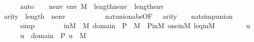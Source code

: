 \begin{isabellebody}
\ \ \ \ \isamarkupfalse%
\ auto\isanewline
\ \ \isamarkupfalse%
\ {\isacartoucheopen}nenv{\isasymin}{\isacharunderscore}{\kern0pt}{\isacartoucheclose}\ {\isacartoucheopen}env{\isasymin}{\isacharunderscore}{\kern0pt}{\isacartoucheclose}\ {\isacartoucheopen}{\isasympi}{\isasymin}M{\isacartoucheclose}\ {\isacartoucheopen}{\isasymphi}{\isasymin}{\isacharunderscore}{\kern0pt}{\isacartoucheclose}\ {\isacartoucheopen}length{\isacharparenleft}{\kern0pt}nenv{\isacharparenright}{\kern0pt}\ {\isacharequal}{\kern0pt}\ length{\isacharparenleft}{\kern0pt}env{\isacharparenright}{\kern0pt}{\isacartoucheclose}\isanewline
\ \ \isamarkupfalse%
\ {\isachardoublequoteopen}arity{\isacharparenleft}{\kern0pt}{\isacharquery}{\kern0pt}{\isasymchi}{\isacharparenright}{\kern0pt}\ {\isasymle}\ length{\isacharparenleft}{\kern0pt}{\isacharbrackleft}{\kern0pt}{\isasymtheta}{\isacharbrackright}{\kern0pt}\ {\isacharat}{\kern0pt}\ nenv\ {\isacharat}{\kern0pt}\ {\isacharbrackleft}{\kern0pt}{\isasympi}{\isacharbrackright}{\kern0pt}{\isacharparenright}{\kern0pt}{\isachardoublequoteclose}\ \ {\isasymtheta}\ \isanewline
\ \ \ \ \isamarkupfalse%
\ nat{\isacharunderscore}{\kern0pt}union{\isacharunderscore}{\kern0pt}abs{}{\isacharbrackleft}{\kern0pt}OF\ {\isacharunderscore}{\kern0pt}\ {\isacharunderscore}{\kern0pt}\ {\isacartoucheopen}arity{\isacharparenleft}{\kern0pt}{\isasymphi}{\isacharparenright}{\kern0pt}\ {\isasymle}\ {}{\isacharhash}{\kern0pt}{\isacharplus}{\kern0pt}\ {\isacharunderscore}{\kern0pt}{\isacartoucheclose}{\isacharbrackright}{\kern0pt}\ nat{\isacharunderscore}{\kern0pt}simp{\isacharunderscore}{\kern0pt}union\ \isanewline
\ \ \ \ \isamarkupfalse%
\ simp\ \ \ \ \isanewline
\ \ \isamarkupfalse%
\ in{\isacharunderscore}{\kern0pt}M\ {\isacharequal}{\kern0pt}\ {\isacartoucheopen}{\isasympi}{\isasymin}M{\isacartoucheclose}\ {\isacartoucheopen}domain{\isacharparenleft}{\kern0pt}{\isasympi}{\isacharparenright}{\kern0pt}\ {\isasymtimes}\ P\ {\isasymin}\ M{\isacartoucheclose}\ \ P{\isacharunderscore}{\kern0pt}in{\isacharunderscore}{\kern0pt}M\ one{\isacharunderscore}{\kern0pt}in{\isacharunderscore}{\kern0pt}M\ leq{\isacharunderscore}{\kern0pt}in{\isacharunderscore}{\kern0pt}M\isanewline
\ \ \isacommand{{\isacharbraceleft}{\kern0pt}}\isamarkupfalse%
\isanewline
\ \ \ \ \isamarkupfalse%
\ u\isanewline
\ \ \ \ \isamarkupfalse%
\ {\isachardoublequoteopen}u\ {\isasymin}\ domain{\isacharparenleft}{\kern0pt}{\isasympi}{\isacharparenright}{\kern0pt}\ {\isasymtimes}\ P{\isachardoublequoteclose}\ {\isachardoublequoteopen}u\ {\isasymin}\ M{\isachardoublequoteclose}\isanewline

\end{isabellebody}
